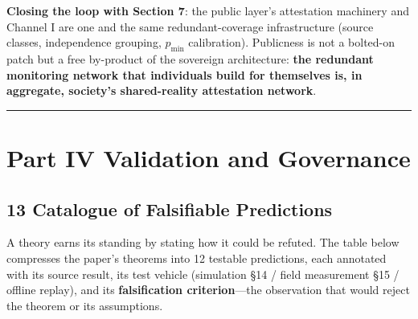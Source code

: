 \documentclass[
  11pt]{article}
\begin{document}
\textbf{Closing the loop with Section 7}: the public layer's attestation
machinery and Channel I are one and the same redundant-coverage
infrastructure (source classes, independence grouping, \(p_{\min}\)
calibration). Publicness is not a bolted-on patch but a free by-product
of the sovereign architecture: \textbf{the redundant monitoring network
that individuals build for themselves is, in aggregate, society's
shared-reality attestation network}.

\begin{center}\rule{0.5\linewidth}{0.5pt}\end{center}

\section{Part IV Validation and
Governance}\label{part-iv-validation-and-governance}

\subsection{13 Catalogue of Falsifiable
Predictions}\label{catalogue-of-falsifiable-predictions}

A theory earns its standing by stating how it could be refuted. The
table below compresses the paper's theorems into 12 testable
predictions, each annotated with its source result, its test vehicle
(simulation §14 / field measurement §15 / offline replay), and its
\textbf{falsification criterion}---the observation that would reject the
theorem or its assumptions.
\end{document}
